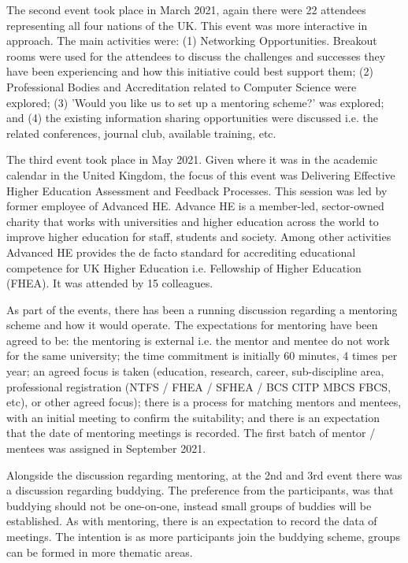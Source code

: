 \documentclass[sigconf]{acmart}
\begin{document}
The second event took place in March 2021, again there were 22 attendees representing all four nations of the UK. This event was more interactive in approach. The main activities were: (1) Networking Opportunities. Breakout rooms were used for the attendees to discuss the challenges and successes they have been experiencing and how this initiative could best support them; (2) Professional Bodies and Accreditation related to Computer Science were explored; (3) 'Would you like us to set up a mentoring scheme?' was explored; and (4) the existing information sharing opportunities were discussed i.e. the related conferences, journal club, available training, etc. 

The third event took place in May 2021. Given where it was in the academic calendar in the United Kingdom, the focus of this event was Delivering Effective Higher Education Assessment and Feedback Processes. This session was led by former employee of Advanced HE. Advance HE is a member-led, sector-owned charity that works with universities and higher education across the world to improve higher education for staff, students and society. Among other activities Advanced HE provides the de facto standard for accrediting educational competence for UK Higher Education i.e. Fellowship of Higher Education (FHEA). It was attended by 15 colleagues.

As part of the events, there has been a running discussion regarding a mentoring scheme and how it would operate. The expectations for mentoring have been agreed to be: the mentoring is external i.e. the mentor and mentee do not work for the same university; the time commitment is initially 60 minutes, 4 times per year; an agreed focus is taken (education, research, career, sub-discipline area, professional registration (NTFS / FHEA / SFHEA / BCS CITP MBCS FBCS, etc), or other agreed focus); there is a process for matching mentors and mentees, with an initial meeting to confirm the suitability; and there is an expectation that the date of mentoring meetings is recorded. The first batch of mentor / mentees was assigned in September 2021. 

Alongside the discussion regarding mentoring, at the 2nd and 3rd event there was a discussion regarding buddying. The preference from the participants, was that buddying should not be one-on-one, instead small groups of buddies will be established. As with mentoring, there is an expectation to record the data of meetings. The intention is as more participants join the buddying scheme, groups can be formed in more thematic areas. 
\end{document}
